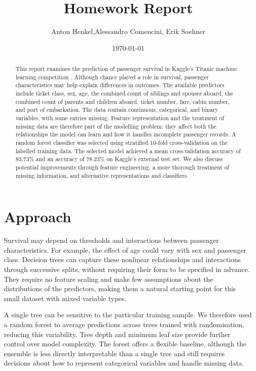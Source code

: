 \documentclass[11pt,a4paper]{article}
\title{Homework Report}
\author{Anton Henkel,Alessandro Comencini, Erik Soehner}
\date{\today}
\begin{document}
\maketitle
\thispagestyle{empty}

\setcounter{page}{1}

\begin{abstract}
This report examines the prediction of passenger survival in Kaggle's Titanic machine learning competition \cite{kaggle-titanic}. Although chance played a role in survival, passenger characteristics may help explain differences in outcomes. The available predictors include ticket class, sex, age, the combined count of siblings and spouses aboard, the combined count of parents and children aboard, ticket number, fare, cabin number, and port of embarkation. The data contain continuous, categorical, and binary variables, with some entries missing. Feature representation and the treatment of missing data are therefore part of the modelling problem: they affect both the relationships the model can learn and how it handles incomplete passenger records. A random forest classifier was selected using stratified 10-fold cross-validation on the labelled training data. The selected model achieved a mean cross-validation accuracy of 83.73\% and an accuracy of 78.23\% on Kaggle's external test set. We also discuss potential improvements through feature engineering, a more thorough treatment of missing information, and alternative representations and classifiers.
\end{abstract}

\section{Approach}

Survival may depend on thresholds and interactions between passenger characteristics. For example, the effect of age could vary with sex and passenger class. Decision trees can capture these nonlinear relationships and interactions through successive splits, without requiring their form to be specified in advance. They require no feature scaling and make few assumptions about the distributions of the predictors, making them a natural starting point for this small dataset with mixed variable types.

A single tree can be sensitive to the particular training sample. We therefore used a random forest to average predictions across trees trained with randomisation, reducing this variability. Tree depth and minimum leaf size provide further control over model complexity. The forest offers a flexible baseline, although the ensemble is less directly interpretable than a single tree and still requires decisions about how to represent categorical variables and handle missing data.
\end{document}
